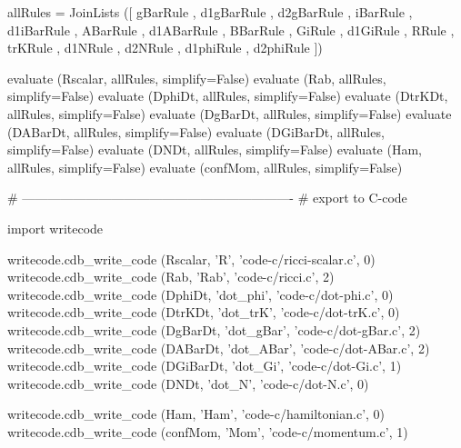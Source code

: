 \documentclass[12pt]{cdblatex}
\begin{document}
\begin{cadabra}
   allRules = JoinLists ([ gBarRule , d1gBarRule , d2gBarRule ,
                           iBarRule , d1iBarRule ,
                           ABarRule , d1ABarRule ,
                           BBarRule ,
                           GiRule , d1GiRule ,
                           RRule ,
                           trKRule ,
                           d1NRule , d2NRule ,
                           d1phiRule , d2phiRule ])

   evaluate (Rscalar,  allRules, simplify=False)
   evaluate (Rab,      allRules, simplify=False)
   evaluate (DphiDt,   allRules, simplify=False)
   evaluate (DtrKDt,   allRules, simplify=False)
   evaluate (DgBarDt,  allRules, simplify=False)
   evaluate (DABarDt,  allRules, simplify=False)
   evaluate (DGiBarDt, allRules, simplify=False)
   evaluate (DNDt,     allRules, simplify=False)
   evaluate (Ham,      allRules, simplify=False)
   evaluate (confMom,  allRules, simplify=False)

   # ----------------------------------------------------------------
   # export to C-code

   import writecode

   writecode.cdb_write_code (Rscalar,  'R',         'code-c/ricci-scalar.c', 0)
   writecode.cdb_write_code (Rab,      'Rab',       'code-c/ricci.c',        2)
   writecode.cdb_write_code (DphiDt,   'dot_phi',   'code-c/dot-phi.c',      0)
   writecode.cdb_write_code (DtrKDt,   'dot_trK',   'code-c/dot-trK.c',      0)
   writecode.cdb_write_code (DgBarDt,  'dot_gBar',  'code-c/dot-gBar.c',     2)
   writecode.cdb_write_code (DABarDt,  'dot_ABar',  'code-c/dot-ABar.c',     2)
   writecode.cdb_write_code (DGiBarDt, 'dot_Gi',    'code-c/dot-Gi.c',       1)
   writecode.cdb_write_code (DNDt,     'dot_N',     'code-c/dot-N.c',        0)

   writecode.cdb_write_code (Ham,      'Ham',       'code-c/hamiltonian.c',  0)
   writecode.cdb_write_code (confMom,  'Mom',       'code-c/momentum.c',     1)

\end{cadabra}
\end{document}
